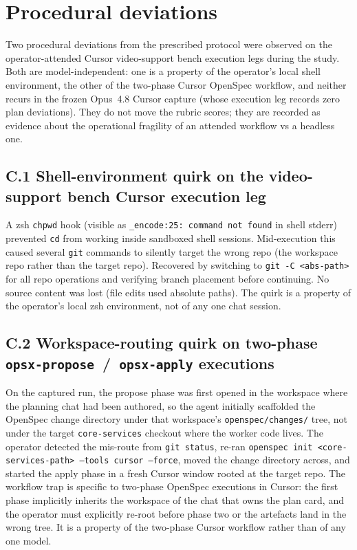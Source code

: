 \section{Procedural deviations}
\label{app:procdev}

Two procedural deviations from the prescribed protocol were observed
on the operator-attended Cursor video-support bench execution legs during
the study. Both are model-independent: one is a property of the
operator's local shell environment, the other of the two-phase
Cursor OpenSpec workflow, and neither recurs in the frozen
Opus~4.8 Cursor capture (whose execution leg records zero plan
deviations). They do not move the rubric scores; they are recorded as
evidence about the operational fragility of an attended workflow vs a
headless one.

\subsection*{C.1 Shell-environment quirk on the video-support bench
Cursor execution leg}

A zsh \texttt{chpwd} hook (visible as
\texttt{\_encode:25: command not found} in shell stderr) prevented
\texttt{cd} from working inside sandboxed shell sessions. Mid-execution
this caused several \texttt{git} commands to silently target the wrong
repo (the workspace repo rather than the target repo). Recovered by
switching to \texttt{git -C <abs-path>} for all repo operations and
verifying branch placement before continuing. No source content was
lost (file edits used absolute paths). The quirk is a property of the
operator's local zsh environment, not of any one chat session.

\subsection*{C.2 Workspace-routing quirk on two-phase
\texttt{opsx-propose}~/~\texttt{opsx-apply} executions}

On the captured run, the propose phase was first opened in the
workspace where the planning chat had been authored, so the agent
initially scaffolded the OpenSpec change directory under that
workspace's \texttt{openspec/changes/} tree, not under the target
\texttt{core-services} checkout where the worker code lives. The
operator detected the mis-route from \texttt{git status}, re-ran
\texttt{openspec init <core-services-path> --tools cursor --force},
moved the change directory across, and started the apply phase in a
fresh Cursor window rooted at the target repo. The workflow trap is
specific to two-phase OpenSpec executions in Cursor: the first
phase implicitly inherits the workspace of the chat that owns the
plan card, and the operator must explicitly re-root before phase two
or the artefacts land in the wrong tree. It is a property of the
two-phase Cursor workflow rather than of any one model.

